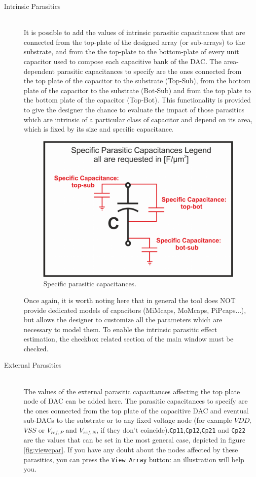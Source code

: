 \begin{description}
\item[Intrinsic Parasitics] \hfill \\
           It is possible to add the values of  intrinsic parasitic capacitances that are connected from the top-plate of the designed array (or sub-arrays) to the substrate, and from the the top-plate to the bottom-plate of every unit capacitor used to compose each capacitive bank of the DAC. The area-dependent parasitic capacitances to specify are the ones connected from the top plate of the capacitor to the substrate (Top-Sub), from the bottom plate of the capacitor to the substrate (Bot-Sub) and from the top plate to the bottom plate of the capacitor (Top-Bot).
This functionality is provided to give the designer the chance to evaluate the impact of those parasitics which are intrinsic of a particular class of capacitor and depend on its area, which is fixed by its size and specific capacitance.

\begin{figure}[h!]
	\centering
	\includegraphics[scale=0.5]{pics/specpar.png}
	\caption{Specific parasitic capacitances.}
	\label{fig:specpar}
\end{figure}

Once again, it is worth noting here that in general the tool does NOT provide dedicated models of capacitors (MiMcaps, MoMcaps, PiPcaps...), but allows the designer to customize all the parameters which are necessary to model them. To enable the intrinsic parasitic effect estimation, the checkbox related section of the main window must be checked.

	\item[External Parasitics] \hfill \\
	The values of the external parasitic capacitances affecting the top plate node of DAC can be added here. The parasitic capacitances to specify are the ones connected from the top plate of the capacitive DAC and eventual sub-DACs to the substrate or to any fixed voltage node (for example $VDD$, $VSS$ or $V_{ref,P}$ and $V_{ref,N}$, if they don't coincide).\texttt{Cp11},\texttt{Cp12},\texttt{Cp21} and \texttt{Cp22} are the values that can be set in the most general case, depicted in figure \ref{fig:viewcpar}. If you have any doubt about the nodes affected by these parasitics, you can press the \texttt{View Array} button: an illustration will help you. 
	

\end{description}
